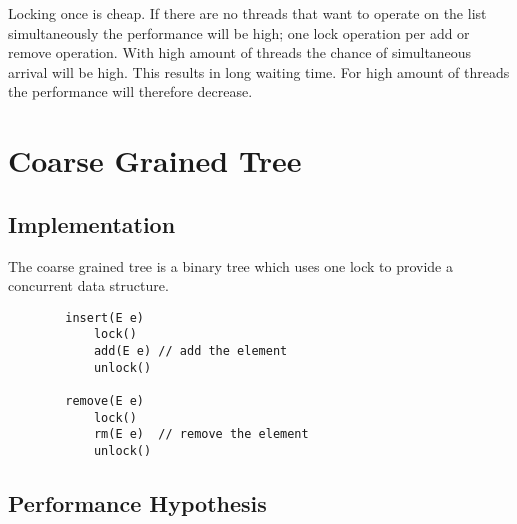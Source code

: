 \documentclass[10pt,a4paper]{article}
\begin{document}
Locking once is cheap. If there are no threads that want to operate on the list simultaneously the performance will be high; one lock operation per add or remove operation. 
With high amount of threads the chance of simultaneous arrival will be high. This results in long waiting time. For high amount of threads the performance will therefore decrease. 

\section{Coarse Grained Tree}
\subsection{Implementation}

The coarse grained tree is a binary tree which uses one lock to provide a concurrent data structure.

    \begin{lstlisting}
        insert(E e) 
            lock()
            add(E e) // add the element
            unlock()

        remove(E e)
            lock()
            rm(E e)  // remove the element
            unlock()
    \end{lstlisting}

\subsection{Performance Hypothesis}
\end{document}
